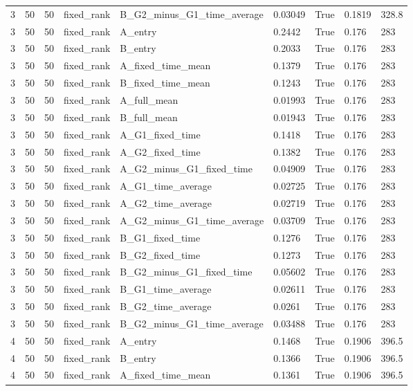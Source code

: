 \begin{longtable}{lllllllll}
3 & 50 & 50 & fixed\_rank & B\_G2\_minus\_G1\_time\_average & 0.03049 & True & 0.1819 & 328.8 \\
3 & 50 & 50 & fixed\_rank & A\_entry & 0.2442 & True & 0.176 & 283 \\
3 & 50 & 50 & fixed\_rank & B\_entry & 0.2033 & True & 0.176 & 283 \\
3 & 50 & 50 & fixed\_rank & A\_fixed\_time\_mean & 0.1379 & True & 0.176 & 283 \\
3 & 50 & 50 & fixed\_rank & B\_fixed\_time\_mean & 0.1243 & True & 0.176 & 283 \\
3 & 50 & 50 & fixed\_rank & A\_full\_mean & 0.01993 & True & 0.176 & 283 \\
3 & 50 & 50 & fixed\_rank & B\_full\_mean & 0.01943 & True & 0.176 & 283 \\
3 & 50 & 50 & fixed\_rank & A\_G1\_fixed\_time & 0.1418 & True & 0.176 & 283 \\
3 & 50 & 50 & fixed\_rank & A\_G2\_fixed\_time & 0.1382 & True & 0.176 & 283 \\
3 & 50 & 50 & fixed\_rank & A\_G2\_minus\_G1\_fixed\_time & 0.04909 & True & 0.176 & 283 \\
3 & 50 & 50 & fixed\_rank & A\_G1\_time\_average & 0.02725 & True & 0.176 & 283 \\
3 & 50 & 50 & fixed\_rank & A\_G2\_time\_average & 0.02719 & True & 0.176 & 283 \\
3 & 50 & 50 & fixed\_rank & A\_G2\_minus\_G1\_time\_average & 0.03709 & True & 0.176 & 283 \\
3 & 50 & 50 & fixed\_rank & B\_G1\_fixed\_time & 0.1276 & True & 0.176 & 283 \\
3 & 50 & 50 & fixed\_rank & B\_G2\_fixed\_time & 0.1273 & True & 0.176 & 283 \\
3 & 50 & 50 & fixed\_rank & B\_G2\_minus\_G1\_fixed\_time & 0.05602 & True & 0.176 & 283 \\
3 & 50 & 50 & fixed\_rank & B\_G1\_time\_average & 0.02611 & True & 0.176 & 283 \\
3 & 50 & 50 & fixed\_rank & B\_G2\_time\_average & 0.0261 & True & 0.176 & 283 \\
3 & 50 & 50 & fixed\_rank & B\_G2\_minus\_G1\_time\_average & 0.03488 & True & 0.176 & 283 \\
4 & 50 & 50 & fixed\_rank & A\_entry & 0.1468 & True & 0.1906 & 396.5 \\
4 & 50 & 50 & fixed\_rank & B\_entry & 0.1366 & True & 0.1906 & 396.5 \\
4 & 50 & 50 & fixed\_rank & A\_fixed\_time\_mean & 0.1361 & True & 0.1906 & 396.5 \\

\end{longtable}
